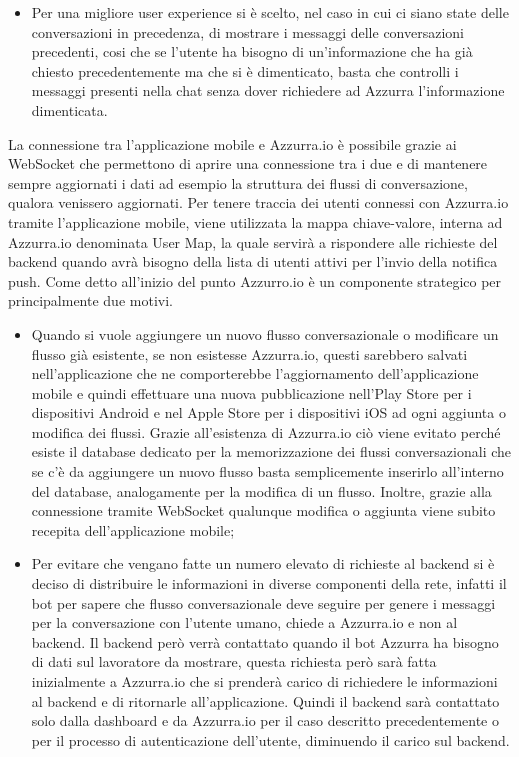 \begin{trivlist}
\begin{itemize}
		\item Per una migliore user experience si è scelto, nel caso in cui ci siano state delle conversazioni in precedenza, di mostrare i messaggi delle conversazioni precedenti, cosi che se l'utente ha bisogno di un’informazione  che ha già chiesto precedentemente ma che si è dimenticato, basta che controlli i messaggi presenti nella chat senza dover richiedere ad Azzurra l'informazione dimenticata.
	\end{itemize}
	La connessione tra l'applicazione mobile e Azzurra.io è possibile grazie ai WebSocket che permettono di aprire una connessione tra i due e di mantenere sempre aggiornati i dati ad esempio la struttura dei flussi di conversazione, qualora venissero aggiornati. Per tenere traccia dei utenti connessi con Azzurra.io tramite l'applicazione mobile, viene utilizzata la mappa chiave-valore, interna ad Azzurra.io denominata User Map, la quale servirà a rispondere alle richieste del backend quando avrà bisogno della lista di utenti attivi per l'invio della notifica push. Come detto all'inizio del punto Azzurro.io è un componente strategico per principalmente due motivi.
	\begin{itemize}
		\item Quando si vuole aggiungere un nuovo flusso conversazionale o modificare un flusso già esistente, se non esistesse Azzurra.io, questi sarebbero salvati nell'applicazione che ne comporterebbe l'aggiornamento dell'applicazione mobile e quindi effettuare una nuova pubblicazione nell'Play Store per i dispositivi Android e nel Apple Store per i dispositivi iOS ad ogni aggiunta o modifica dei flussi. Grazie all'esistenza di Azzurra.io ciò viene evitato perché esiste il database dedicato per la memorizzazione dei flussi conversazionali che se c'è da aggiungere un nuovo flusso basta semplicemente inserirlo all'interno del database, analogamente per la modifica di un flusso. Inoltre, grazie alla connessione tramite WebSocket qualunque modifica o aggiunta viene subito recepita dell'applicazione mobile;
		\item Per evitare che vengano fatte un numero elevato di richieste al backend si è deciso di distribuire le informazioni in diverse componenti della rete, infatti il bot per sapere che flusso conversazionale deve seguire per genere i messaggi per la conversazione con l'utente umano, chiede a Azzurra.io e non al backend. Il backend però verrà contattato quando il bot Azzurra ha bisogno di dati sul lavoratore da mostrare, questa richiesta però sarà fatta inizialmente a Azzurra.io che si prenderà carico di richiedere le informazioni al backend e di ritornarle all'applicazione. Quindi il backend sarà contattato solo dalla dashboard e da Azzurra.io per il caso descritto precedentemente o per il processo di autenticazione dell'utente, diminuendo il carico sul backend.
	\end{itemize}
	

\end{trivlist}
